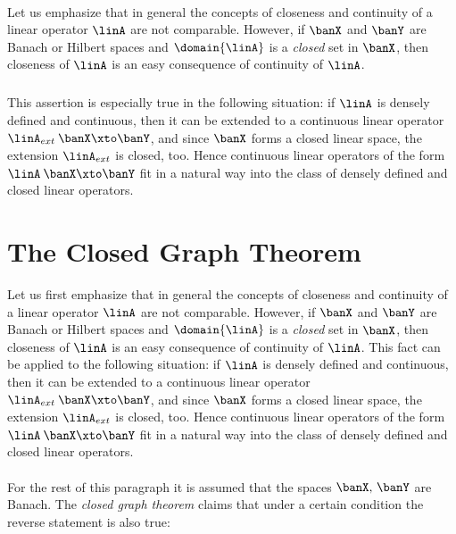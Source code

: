 \documentclass[11pt,twoside]{article}
\begin{document}
\paragraph{} %
Let us emphasize that in general 
the concepts of closeness and continuity of a linear operator $\linA$
are not comparable.
However,
if $\banX$ and $\banY$ are Banach or Hilbert spaces
and $\domain{\linA}$ is a \textit{closed} set in $\banX$,
then closeness of $\linA$ is an easy consequence of continuity of $\linA$.

\subparagraph{}
This assertion is especially true in the following situation:
if $\linA$ is densely defined and continuous,
then it can be extended to a continuous linear operator
$\linA_{ext} \: \banX \xto \banY$,
and since $\banX$ forms a closed linear space,
the extension $\linA_{ext}$ is closed,
too.
Hence continuous linear operators of the form $\linA \: \banX \xto \banY$
fit in a natural way
into the class of densely defined and closed linear operators.

\section{The Closed Graph Theorem}
Let us first emphasize that in general 
the concepts of closeness and continuity of a linear operator $\linA$
are not comparable.
However,
if $\banX$ and $\banY$ are Banach or Hilbert spaces
and $\domain{\linA}$ is a \textit{closed} set in $\banX$,
then closeness of $\linA$ is an easy consequence of continuity of $\linA$.
This fact can be applied to the following situation:
if $\linA$ is densely defined and continuous,
then it can be extended to a continuous linear operator
$\linA_{ext} \: \banX \xto \banY$,
and since $\banX$ forms a closed linear space,
the extension $\linA_{ext}$ is closed,
too.
Hence continuous linear operators of the form $\linA \: \banX \xto \banY$
fit in a natural way
into the class of densely defined and closed linear operators.

\paragraph{} %
For the rest of this paragraph it is assumed that the spaces $\banX,\,\banY$
are Banach.
The \textit{closed graph theorem} claims that
under a certain condition the reverse statement is also true:
\end{document}
